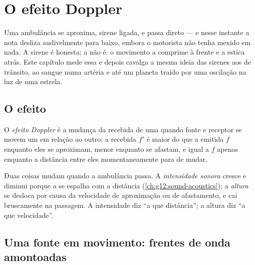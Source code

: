 \chapter{O efeito Doppler}\label{ch:g12:doppler-effect}

Uma ambulância se aproxima, sirene ligada, e passa direto --- e nesse
instante a nota desliza audivelmente para baixo, embora o motorista não
tenha mexido em nada. A sirene é honesta; a  não é: o movimento a
comprime à frente e a estica atrás. Este capítulo mede essa  e
depois cavalga a mesma ideia das sirenes aos  de trânsito, ao
sangue numa artéria e até um planeta traído por uma oscilação na luz de
uma estrela.

\section{O efeito}

\begin{definition}\label{def:g12:doppler-effect:doppler}
O \emph{efeito Doppler} é a mudança da 
recebida de uma  quando fonte e receptor se movem um em relação ao
outro: a  recebida $f'$ é maior do que a  emitida $f$
enquanto eles se aproximam, menor enquanto se afastam, e igual a $f$
apenas enquanto a distância entre eles momentaneamente para de mudar.
\end{definition}

\begin{remark}\label{rem:g12:doppler-effect:pitch}
Duas coisas mudam quando a ambulância passa. A \emph{intensidade sonora}
cresce e diminui porque a  se espalha com a distância
(\cref{ch:g12:sound-acoustics}); a \emph{altura} se desloca por causa da
velocidade de aproximação ou de afastamento, e cai bruscamente na
passagem. A intensidade diz ``a que distância''; a altura diz ``a que
velocidade''.
\end{remark}

\section{Uma fonte em movimento: frentes de onda amontoadas}

